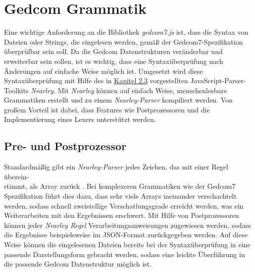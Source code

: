 \section{Gedcom Grammatik}
\label{sec: Konzept - Gedcom Grammatik}
Eine wichtige Anforderung an die Bibliothek \textit{gedcom7.js} ist, dass die Syntax von Dateien oder Strings, die eingelesen werden, gemäß der Gedcom7-Spezifikation überprüfbar sein soll. Da die Gedcom Datenstrukturen veränderbar und erweiterbar sein sollen, ist es wichtig, dass eine Syntaxüberprüfung nach Änderungen auf einfache Weise möglich ist. Umgesetzt wird diese Syntaxüberprüfung mit Hilfe des in \hyperref[sec: Nearley]{Kapitel 2.3} vorgestellten JavaScript-Parser-Toolkits \textit{Nearley}. Mit \textit{Nearley} können auf einfach Weise, menschenlesbare Grammatiken erstellt und zu einem \textit{Nearley-Parser} kompiliert werden. Von großem Vorteil ist dabei, dass Features wie Postprozessoren und die Implementierung eines Lexers unterstützt werden. 

\subsection{Pre- und Postprozessor}
\label{subsec: Konzept - Gedcom Grammatik - Pre- und Postprozessor}
Standardmäßig gibt ein \textit{Nearley-Parser} jedes Zeichen, das mit einer Regel überein-\\stimmt, als Array zurück \cite{NearleyDoc}. Bei komplexeren Grammatiken wie der Gedcom7 Spezifikation führt dies dazu, dass sehr viele Arrays ineinander verschachtelt werden, sodass schnell zweistellige Verschatlungsgrade erreicht werden, was ein Weiterarbeiten mit den Ergebnissen erschwert. Mit Hilfe von Postprozessoren können jeder \textit{Nearley Regel} Verarbeitungsanweisungen zugewiesen werden, sodass die Ergebnisse beispielsweise im JSON-Format zurückgegeben werden. Auf diese Weise können die eingelesenen Dateien bereits bei der Syntaxüberprüfung in eine passende Darstellungsform gebracht werden, sodass eine leichte Überführung in die passende Gedcom Datenstruktur möglich ist.

